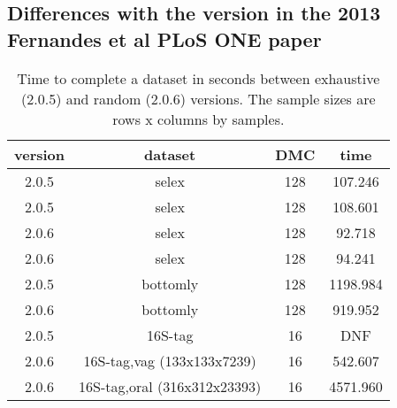 \documentclass[11pt]{article}
\begin{document}
\subsection{Differences with the version in the 2013 Fernandes et al PLoS ONE paper}  
\begin{table}
\caption{Time to complete a dataset in seconds between exhaustive (2.0.5) and random (2.0.6) versions. The sample sizes are rows x columns by samples.}
\begin{tabular}{cccc}

version & dataset & DMC  &  time\\\hline
2.0.5  &  selex  &  128  &  107.246\\
2.0.5  &  selex  &  128  &  108.601\\
2.0.6  &  selex  &  128  &  92.718\\
2.0.6  &  selex  &  128  &  94.241\\
2.0.5  &  bottomly  &  128  &  1198.984   \\
2.0.6  &  bottomly  &  128  &  919.952\\
2.0.5  &  16S-tag  &  16  &  DNF\\
2.0.6  &  16S-tag,vag (133x133x7239)  &  16  &  542.607\\
2.0.6  &  16S-tag,oral (316x312x23393)  &  16  &  4571.960\\
\end{tabular}
\label{exvsra}

\end{table}
\end{document}

